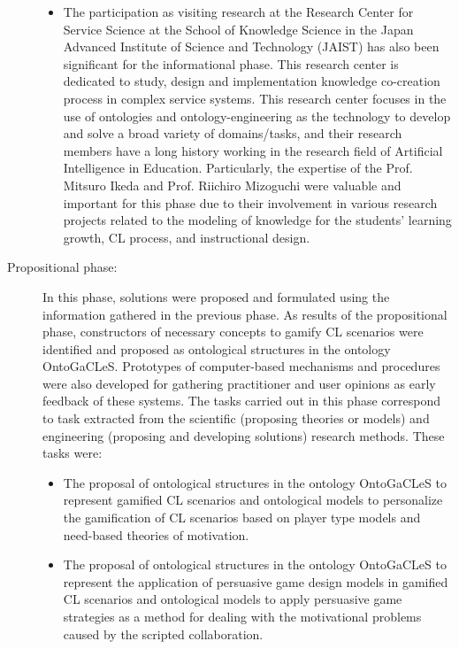 \begin{description}
\begin{itemize}
\item
The participation as visiting research at the Research Center for Service Science at the School of Knowledge Science in the Japan Advanced Institute of Science and Technology (JAIST) has also been significant for the informational phase. This research center is dedicated to study, design and implementation knowledge co-creation process in complex service systems.  This research center focuses in the use of ontologies and ontology-engineering as the technology to develop and solve a broad variety of domains/tasks, and their research members have a long history working in the research field of Artificial Intelligence in Education. Particularly, the expertise of the Prof. Mitsuro Ikeda and Prof. Riichiro Mizoguchi were valuable and important for this phase due to their involvement in various research projects related to the modeling of knowledge for the students’ learning growth, CL process, and instructional design.
\end{itemize}

\item[Propositional phase:]
In this phase, solutions were proposed and formulated using the information gathered in the previous phase. As results of the propositional phase, constructors of necessary concepts to gamify CL scenarios were identified and proposed as ontological structures in the ontology OntoGaCLeS. Prototypes of computer-based mechanisms and procedures were also developed for gathering practitioner and user opinions as early feedback of these systems. The tasks carried out in this phase correspond to task extracted from the scientific (proposing theories or models) and engineering (proposing and developing solutions) research methods. These tasks were:

\begin{itemize}
\item
The proposal of ontological structures in the ontology OntoGaCLeS to represent gamified CL scenarios and ontological models to personalize the gamification of CL scenarios based on player type models and need-based theories of motivation.

\item
The proposal of ontological structures in the ontology OntoGaCLeS to represent the application of persuasive game design models in gamified CL scenarios and ontological models to apply persuasive game strategies as a method for dealing with the motivational problems caused by the scripted collaboration.


\end{itemize}
\end{description}

